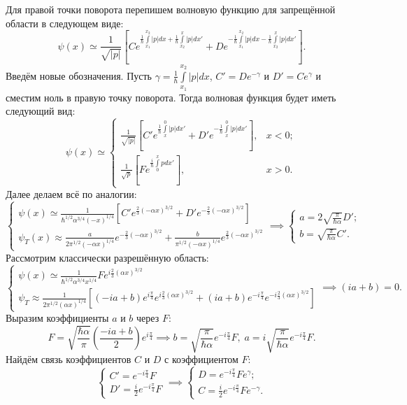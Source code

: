 Для правой точки поворота перепишем волновую функцию для запрещённой области в
следующем виде:
\[
  \psi(x) \simeq \frac{1}{\sqrt{|p|}} \left[ Ce^{\frac{1}{\hbar}\int\limits_{x_1}^{x_2} |p| dx + \frac{1}{\hbar}\int\limits_{x_2}^{x} |p| dx'} + De^{-\frac{1}{\hbar}\int\limits_{x_1}^{x_2} |p| dx - \frac{1}{\hbar}\int\limits_{x_2}^{x} |p| dx'} \right].
\]
Введём новые обозначения. Пусть $\gamma =
  \frac{1}{\hbar}\int\limits_{x_1}^{x_2} |p| dx$, $C' = De^{-\gamma}$ и $D' =
  Ce^{\gamma}$ и сместим ноль в правую точку поворота. Тогда волновая функция
будет иметь следующий вид:
\[
  \psi(x) \simeq
  \begin{cases}
    \frac{1}{\sqrt{|p|}}\left[ C'e^{\frac{1}{\hbar}\int\limits_{x}^{0} |p| dx'} + D'e^{-\frac{1}{\hbar}\int\limits_{x}^{0} |p| dx'} \right], & x < 0;\\
    \frac{1}{\sqrt{p}}\left[ Fe^{\frac{i}{\hbar}\int\limits_{0}^{x} p dx'} \right], & x > 0.
  \end{cases}
\]
Далее делаем всё по аналогии:
\[
  \begin{cases}
    \psi(x) \simeq \frac{1}{\hbar^{1/2}\alpha^{3/4}(-x)^{1/4}}\left[ C'e^{\frac{2}{3}(-\alpha x)^{3/2}} + D'e^{-\frac{2}{3}(-\alpha x)^{3/2}} \right]\\
    \psi_T(x) \approx \frac{a}{2\pi^{1/2}(-\alpha x)^{1/4}}e^{-\frac{2}{3}(-\alpha x)^{3/2}} + \frac{b}{\pi^{1/2}(-\alpha x)^{1/4}}e^{\frac{2}{3}(-\alpha x)^{3/2}}
  \end{cases}
  \implies
  \begin{cases}
    a = 2\sqrt{\frac{\pi}{\hbar\alpha}}D';\\
    b = \sqrt{\frac{\pi}{\hbar\alpha}}C'.
  \end{cases}
\]
Рассмотрим классически разрешённую область:
\[
  \begin{cases}
    \psi(x) \simeq \frac{1}{\hbar^{1/2}\alpha^{3/4}x^{1/4}}Fe^{i\frac{2}{3}(\alpha x)^{3/2}}\\
    \psi_T \approx \frac{1}{2\pi^{1/2}(\alpha x)^{1/4}}\left[ (-ia + b)e^{i\frac{\pi}{4}}e^{i\frac{2}{3}(\alpha x)^{3/2}} + (ia+b)e^{-i\frac{\pi}{4}}e^{-i\frac{2}{3}(\alpha x)^{3/2}} \right]
  \end{cases}
  \implies (ia + b) = 0.
\]
Выразим коэффициенты $a$ и $b$ через $F$:
\[
  F = \sqrt{\frac{\hbar\alpha}{\pi}}\left( \frac{-ia + b}{2} \right)e^{i\frac{\pi}{4}} \implies b = \sqrt{\frac{\pi}{\hbar\alpha}} e^{-i\frac{\pi}{4}}F, \; a = i\sqrt{\frac{\pi}{\hbar\alpha}} e^{-i\frac{\pi}{4}}F.
\]
Найдём связь коэффициентов $C$ и $D$ с коэффициентом $F$:
\[
  \begin{cases}
    C' = e^{-i\frac{\pi}{4}}F\\
    D' = \frac{i}{2}e^{-i\frac{\pi}{4}}F
  \end{cases}
  \implies
  \begin{cases}
    D = e^{-i\frac{\pi}{4}}Fe^{\gamma};\\
    C = \frac{i}{2}e^{-i\frac{\pi}{4}}Fe^{-\gamma}.
  \end{cases}
\]
